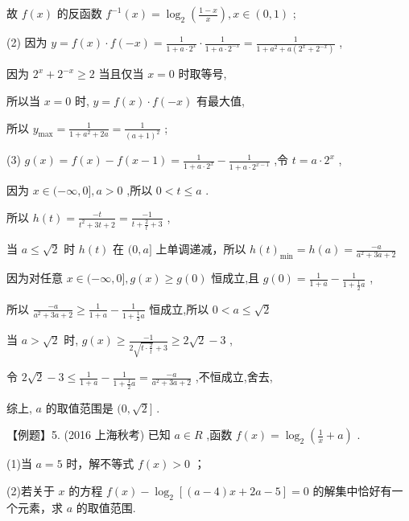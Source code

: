 \documentclass[10pt]{article}
\begin{document}
故 \(f\left( x\right)\) 的反函数 \({f}^{-1}\left( x\right)  = {\log }_{2}\left( \frac{1 - x}{x}\right) ,x \in  \left( {0,1}\right)\) ;

(2) 因为 \(y = f\left( x\right)  \cdot  f\left( {-x}\right)  = \frac{1}{1 + a \cdot  {2}^{x}} \cdot  \frac{1}{1 + a \cdot  {2}^{-x}} = \frac{1}{1 + {a}^{2} + a\left( {{2}^{x} + {2}^{-x}}\right) }\) ,

因为 \({2}^{x} + {2}^{-x} \geq  2\) 当且仅当 \(x = 0\) 时取等号,

所以当 \(x = 0\) 时, \(y = f\left( x\right)  \cdot  f\left( {-x}\right)\) 有最大值,

所以 \({y}_{\max } = \frac{1}{1 + {a}^{2} + {2a}} = \frac{1}{{\left( a + 1\right) }^{2}}\) ;

(3) \(g\left( x\right)  = f\left( x\right)  - f\left( {x - 1}\right)  = \frac{1}{1 + a \cdot  {2}^{x}} - \frac{1}{1 + a \cdot  {2}^{x - 1}}\) ,令 \(t = a \cdot  {2}^{x}\) ,

因为 \(x \in  ( - \infty ,0\rbrack ,a > 0\) ,所以 \(0 < t \leq  a\) .

所以 \(h\left( t\right)  = \frac{-t}{{t}^{2} + {3t} + 2} = \frac{-1}{t + \frac{2}{t} + 3}\) ,

当 \(a \leq  \sqrt{2}\) 时 \(h\left( t\right)\) 在 \((0,a\rbrack\) 上单调递减，所以 \(h{\left( t\right) }_{\min } = h\left( a\right)  = \frac{-a}{{a}^{2} + {3a} + 2}\)

因为对任意 \(x \in  ( - \infty ,0\rbrack ,g\left( x\right)  \geq  g\left( 0\right)\) 恒成立,且 \(g\left( 0\right)  = \frac{1}{1 + a} - \frac{1}{1 + \frac{1}{2}a}\) ,

所以 \(\frac{-a}{{a}^{2} + {3a} + 2} \geq  \frac{1}{1 + a} - \frac{1}{1 + \frac{1}{2}a}\) 恒成立,所以 \(0 < a \leq  \sqrt{2}\)

当 \(a > \sqrt{2}\) 时, \(g\left( x\right)  \geq  \frac{-1}{2\sqrt{t \cdot  \frac{2}{t}} + 3} \geq  2\sqrt{2} - 3\) ,

令 \(2\sqrt{2} - 3 \leq  \frac{1}{1 + a} - \frac{1}{1 + \frac{1}{2}a} = \frac{-a}{{a}^{2} + {3a} + 2}\) ,不恒成立,舍去,

综上, \(a\) 的取值范围是 \((0,\sqrt{2}\rbrack\) .

【例题】5. (2016 上海秋考) 已知 \(a \in  R\) ,函数 \(f\left( x\right)  = {\log }_{2}\left( {\frac{1}{x} + a}\right)\) .

(1)当 \(a = 5\) 时，解不等式 \(f\left( x\right)  > 0\) ；

(2)若关于 \(x\) 的方程 \(f\left( x\right)  - {\log }_{2}\left\lbrack  {\left( {a - 4}\right) x + {2a} - 5}\right\rbrack   = 0\) 的解集中恰好有一个元素，求 \(a\) 的取值范围.
\end{document}
